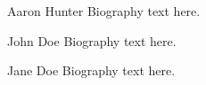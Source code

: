 \documentclass[journal]{IEEEtran}
\begin{document}
% 

\begin{IEEEbiography}{Aaron Hunter}
Biography text here.
\end{IEEEbiography}

\begin{IEEEbiographynophoto}{John Doe}
Biography text here.
\end{IEEEbiographynophoto}


\begin{IEEEbiographynophoto}{Jane Doe}
Biography text here.
\end{IEEEbiographynophoto}






\end{document}
